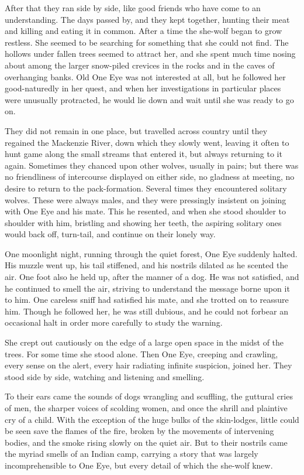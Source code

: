 \documentclass[10pt]{book}
\begin{document}
After that they ran side by side, like good friends who have come to an
understanding. The days passed by, and they kept together, hunting
their meat and killing and eating it in common. After a time the
she-wolf began to grow restless. She seemed to be searching for
something that she could not find. The hollows under fallen trees
seemed to attract her, and she spent much time nosing about among the
larger snow-piled crevices in the rocks and in the caves of overhanging
banks. Old One Eye was not interested at all, but he followed her
good-naturedly in her quest, and when her investigations in particular
places were unusually protracted, he would lie down and wait until she
was ready to go on.

They did not remain in one place, but travelled across country until
they regained the Mackenzie River, down which they slowly went, leaving
it often to hunt game along the small streams that entered it, but
always returning to it again. Sometimes they chanced upon other wolves,
usually in pairs; but there was no friendliness of intercourse
displayed on either side, no gladness at meeting, no desire to return
to the pack-formation. Several times they encountered solitary wolves.
These were always males, and they were pressingly insistent on joining
with One Eye and his mate. This he resented, and when she stood
shoulder to shoulder with him, bristling and showing her teeth, the
aspiring solitary ones would back off, turn-tail, and continue on their
lonely way.

One moonlight night, running through the quiet forest, One Eye suddenly
halted. His muzzle went up, his tail stiffened, and his nostrils
dilated as he scented the air. One foot also he held up, after the
manner of a dog. He was not satisfied, and he continued to smell the
air, striving to understand the message borne upon it to him. One
careless sniff had satisfied his mate, and she trotted on to reassure
him. Though he followed her, he was still dubious, and he could not
forbear an occasional halt in order more carefully to study the
warning.

She crept out cautiously on the edge of a large open space in the midst
of the trees. For some time she stood alone. Then One Eye, creeping and
crawling, every sense on the alert, every hair radiating infinite
suspicion, joined her. They stood side by side, watching and listening
and smelling.

To their ears came the sounds of dogs wrangling and scuffling, the
guttural cries of men, the sharper voices of scolding women, and once
the shrill and plaintive cry of a child. With the exception of the huge
bulks of the skin-lodges, little could be seen save the flames of the
fire, broken by the movements of intervening bodies, and the smoke
rising slowly on the quiet air. But to their nostrils came the myriad
smells of an Indian camp, carrying a story that was largely
incomprehensible to One Eye, but every detail of which the she-wolf
knew.
\end{document}
